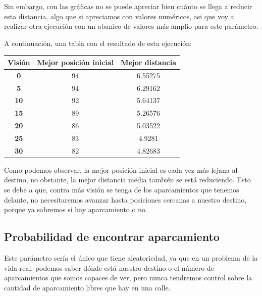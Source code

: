 \documentclass[11pt,a4paper]{report}
\begin{document}
Sin embargo, con las gráficas no se puede apreciar bien cuánto se llega a reducir esta distancia, algo que si
apreciamos con valores numéricos, asi que voy a realizar otra ejecución con un abanico de valores más amplio para este parámetro.

\newpage

A continuación, una tabla con el resultado de esta ejecución:

\begin{table}[H]
\centering
\begin{tabular}{c|cc}
\textbf{Visión} & \textbf{Mejor posición inicial} & \textbf{Mejor distancia} \\ \hline
\textbf{0}      & 94                              & 6.55275                  \\ \hline
\textbf{5}      & 94                              & 6.29162                  \\ \hline
\textbf{10}     & 92                              & 5.64137                  \\ \hline
\textbf{15}     & 89                              & 5.26576                  \\ \hline
\textbf{20}     & 86                              & 5.03522                  \\ \hline
\textbf{25}     & 83                              & 4.9281                   \\ \hline
\textbf{30}     & 82                              & 4.82683                  \\
\end{tabular}
\end{table}

Como podemos observar, la mejor posición inicial es cada vez más lejana al destino, no obstante, la mejor distancia media también
se está reduciendo. Esto se debe a que, contra más visión se tenga de los aparcamientos que tenemos delante, no necesitaremos avanzar
hasta posiciones cercanas a nuestro destino, porque ya sabremos si hay aparcamiento o no.

\subsection{Probabilidad de encontrar aparcamiento}

Este parámetro sería el único que tiene aleatoriedad, ya que en un problema de la vida real, podemos saber dónde está nuestro destino
o el número de aparcamientos que somos capaces de ver, pero nunca tendremos control sobre la cantidad de aparcamiento libres que hay
en una calle.
\end{document}
